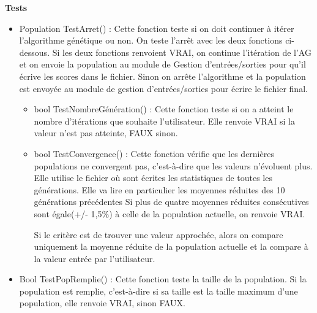 \documentclass[a4paper,11pt]{article}
\begin{document}
			\textbf{Tests}
				\begin{itemize}
							\item Population TestArret() :  Cette fonction teste si on doit continuer à itérer l’algorithme génétique ou non. 
								On teste l’arrêt avec les deux fonctions ci-dessous. 
								Si les deux fonctions renvoient VRAI, on continue l’itération de l’AG et on envoie la population au module de Gestion d’entrées/sorties pour qu’il écrive les scores dans le fichier. 
								Sinon on arrête l'algorithme et la population est envoyée au module de gestion d’entrées/sorties pour écrire le fichier final.\vspace{0.2cm}
								\begin{itemize}
								\item bool TestNombreGénération() : Cette fonction teste si on a atteint le nombre d’itérations que souhaite l’utilisateur.
									Elle renvoie VRAI si la valeur n’est pas atteinte, FAUX sinon.\vspace{0.2cm}
								\item bool TestConvergence() : Cette fonction vérifie que les dernières populations ne convergent pas, c'est-à-dire que les valeurs n'évoluent plus. %
								Elle utilise le fichier où sont écrites les statistiques de toutes les générations. Elle va lire en particulier les moyennes réduites des 10 générations précédentes
															Si plus de quatre moyennes réduites consécutives sont égale(+/- 1,5$\%$) à celle de la population actuelle, on renvoie VRAI.

															Si le critère est de trouver une valeur approchée, alors on compare uniquement la moyenne réduite de la population actuelle et la compare à la valeur entrée par l'utilisateur.\vspace{0.2cm}
								\end{itemize}
							
							\item Bool TestPopRemplie() : Cette fonction teste la taille de la population. Si la population est remplie, c’est-à-dire si sa taille est la taille maximum d’une population, elle renvoie VRAI, sinon FAUX.\vspace{0.2cm}
					
					\end{itemize}
				
\end{document}
